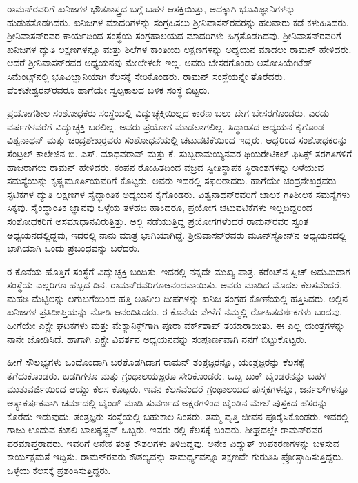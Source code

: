 ರಾಮನ್‍ರವರಿಗೆ ಖನಿಜಗಳ ಭೌತಶಾಸ್ತ್ರದ ಬಗ್ಗೆ ಬಹಳ ಆಸಕ್ತಿಯಿತ್ತು, ಅದಕ್ಕಾಗಿ ಭೂವಿಜ್ಞಾನಿಗಳನ್ನು ಹುಡುಕತೊಡಗಿದರು. ಖನಿಜಗಳ ಮಾದರಿಗಳನ್ನು ಸಂಗ್ರಹಿಸಲು ಶ‍್ರೀನಿವಾಸನ್‍ರವರನ್ನು ಹಲವಾರು ಕಡೆ ಕಳುಹಿಸಿದರು. ಶ‍್ರೀನಿವಾಸನ್‍ರವರ ಕಾರ್ಯದಿಂದ ಸಂಸ್ಥೆಯ ಸಂಗ್ರಹಾಲಯದ ಮಾದರಿಗಳು ಹಿಗ್ಗತೊಡಗಿದವು. ಶ‍್ರೀನಿವಾಸನ್‍ರವರಿಗೆ ಖನಿಜಗಳ ದ್ಯುತಿ ಲಕ್ಷಣಗಳನ್ನೂ ಮತ್ತು ಶಿಲೆಗಳ ಕಾಂತೀಯ ಲಕ್ಷಣಗಳನ್ನು ಅಧ್ಯಯನ ಮಾಡಲು ರಾಮನ್ ಹೇಳಿದರು. ಆದರೆ ಶ‍್ರೀನಿವಾಸನ್‍ರವರ ಅಧ್ಯಯನವು ಮೇಲೇಳಲೇ ಇಲ್ಲ. ಅವರು ಬೇಸರಗೊಂಡು ಅಸೋಸಿಯೇಟೆಡ್ ಸಿಮೆಂಟ್ಸ್‌ನಲ್ಲಿ ಭೂವಿಜ್ಞಾನಿಯಾಗಿ ಕೆಲಸಕ್ಕೆ ಸೇರಿಕೊಂಡರು. ರಾಮನ್ ಸಂಸ್ಥೆಯನ್ನೇ ತೊರೆದರು. ವೆಂಕಟೇಶ್ವರನ್‍ರವರೂ ಹಾಗೆಯೇ ಸ್ವಲ್ಪಕಾಲದ ಬಳಿಕ ಸಂಸ್ಥೆ ಬಿಟ್ಟರು.

ಪ್ರಯೋಗಶೀಲ ಸಂಶೋಧಕರು ಸಂಸ್ಥೆಯಲ್ಲಿ ವಿದ್ಯುಚ್ಛಕ್ತಿಯಿಲ್ಲದ ಕಾರಣ ಬಲು ಬೇಗ ಬೇಸರಗೊಂಡರು. ಎರಡು ವರ್ಷಗಳವರೆಗೆ ವಿದ್ಯುಚ್ಛಕ್ತಿ ಬರಲಿಲ್ಲ. ಅವರು ಪ್ರಯೋಗ ಮಾಡಲಾಗಲಿಲ್ಲ. ಸಿದ್ಧಾಂತದ ಅಧ್ಯಯನ ಕೈಗೊಂಡ ವಿಶ್ವನಾಥನ್ ಮತ್ತು ಚಂದ್ರಶೇಖರ್‍ರವರು ಸಂಶೋಧನೆಯಲ್ಲಿ ಚಟುವಟಿಕೆಯಿಂದ ಇದ್ದರು. ಆದ್ದರಿಂದ ಸಂಶೋಧಕರನ್ನು ಸೆಂಟ್ರಲ್ ಕಾಲೇಜಿನ ಬಿ. ಎಸ್. ಮಾಧವರಾವ್ ಮತ್ತು ಕೆ. ಸುಬ್ಬರಾಮಯ್ಯನವರ ಥಿಯರೇಟಿಕಲ್ ಫಿಸಿಕ್ಸ್ ತರಗತಿಗಳಿಗೆ ಹಾಜರಾಗಲು ರಾಮನ್ ಹೇಳಿದರು. ಕಂಪನ ರೋಹಿತದಿಂದ ವಜ್ರದ ಸ್ವೀತಿಸ್ಥಾಪಕ ಸ್ಥಿರಾಂಶಗಳನ್ನು ಅಳೆಯುವ ಸಮಸ್ಯೆಯನ್ನು ಕೃಷ್ಣಮೂರ್ತಿಯವರಿಗೆ ಕೊಟ್ಟರು. ಅವರು ಇದರಲ್ಲಿ ಸಫಲರಾದರು. ಹಾಗೆಯೇ ಚಂದ್ರಶೇಖರ್‍ರವರು ಸ್ಫಟಿಕಗಳ ದ್ಯುತಿ ಲಕ್ಷಣಗಳ ಸೈದ್ಧಾಂತಿಕ ಅಧ್ಯಯನ ಕೈಗೊಂಡರು. ವಿಶ್ವನಾಥನ್‍ರವರಿಗೆ ಜಾಲಕ ಗತಿಶೀಲಕ ಸಮಸ್ಯೆಗಳು ಸಿಕ್ಕವು. ಸೈಂದ್ಧಾಂತಿಕ ಜ್ಞಾನವು ಒಳ್ಳೆಯ ತಳಹದಿ ಹಾಕಿದರೂ, ಪ್ರಯೋಗ ಚಟುವಟಿಕೆಗಳು ಇಲ್ಲದಿದ್ದರಿಂದ ಸಂಶೋಧಕರಿಗೆ ಅಸಮಾಧಾನವಿರುತ್ತಿತ್ತು. ಅಲ್ಲಿ ನಡೆಯುತ್ತಿದ್ದ ಪ್ರಯೋಗಗಳೆಂದರೆ ರಾಮನ್‍ರವರ ಸ್ವಂತ ಅಧ್ಯಯನದಲ್ಲಿದ್ದವು, ಇದರಲ್ಲಿ ನಾನು ಮಾತ್ರ ಭಾಗಿಯಾಗಿದ್ದೆ. ಶ‍್ರೀನಿವಾಸನ್‍ರವರು ಮೂನ್‍ಸ್ಟೋನ್‍ನ ಅಧ್ಯಯನದಲ್ಲಿ ಭಾಗಿಯಾಗಿ ಒಂದು ಪ್ರಬಂಧವನ್ನು ಬರೆದರು.

ರ ಕೊನೆಯ ಹೊತ್ತಿಗೆ ಸಂಸ್ಥೆಗೆ ವಿದ್ಯುಚ್ಛಕ್ತಿ ಬಂದಿತು. ಇದರಲ್ಲಿ ನನ್ನದೇ ಮುಖ್ಯ ಪಾತ್ರ. ಕರೆಂಟ್‍ನ ಸ್ವಿಚ್ ಅದುಮಿದಾಗ ಸಂಸ್ಥೆಯ ಎಲ್ಲರಿಗೂ ಹಬ್ಬದ ದಿನ. ರಾಮನ್‍ರವರಿಗೂ\break ಆನಂದವಾಯಿತು. ಅವರು ಮಾಡಿದ ಮೊದಲ ಕೆಲಸವೆಂದರೆ, ಮಹಡಿ ಮೆಟ್ಟಿಲನ್ನು ಲಗುಬಗೆಯಿಂದ ಹತ್ತಿ ಅತಿನೀಲ ದೀಪಗಳನ್ನು ಖನಿಜ ಸಂಗ್ರಹ ಕೋಣೆಯಲ್ಲಿ ಹತ್ತಿಸಿದರು. ಅಲ್ಲಿನ ಖನಿಜಗಳ ಪ್ರತಿದೀಪ್ತಿಯನ್ನು ನೋಡಿ ಆನಂದಿಸಿದರು. ರ ಕೊನೆಯ ವೇಳೆಗೆ ನಮ್ಮಲ್ಲಿ ರೋಹಿತದರ್ಶಕಗಳು ಬಂದವು. ಹೀಗೆಯೇ ಎಕ್ಸ್\enginline{-}ರೇ ಘಟಕಗಳು ಮತ್ತು ಮೆಕ್ಯಾನಿಕ್ಸ್‌ಗಾಗಿ ಪೂರಾ ವರ್ಕ್‌ಶಾಪ್ ತಯಾರಾಯಿತು. ಈ ಎಲ್ಲ ಯಂತ್ರಗಳನ್ನು ನಾನೇ ಜೋಡಿಸಿದೆ. ಹಾಗಾಗಿ ಎಕ್ಸ್\enginline{-}ರೇ ವಿವರ್ತನ ಅಧ್ಯಯನವನ್ನು ಸಂಪೂರ್ಣವಾಗಿ ನನಗೆ ಬಿಟ್ಟುಕೊಟ್ಟರು.

ಹೀಗೆ ಸೌಲಭ್ಯಗಳು ಒಂದೊಂದಾಗಿ ಬರತೊಡಗಿದಾಗ ರಾಮನ್ ತಂತ್ರಜ್ಞರನ್ನೂ, ಯಂತ್ರಜ್ಞರನ್ನು ಕೆಲಸಕ್ಕೆ ತೆಗೆದುಕೊಂಡರು. ಬಡಗಿಗಳೂ ಮತ್ತು ಗ್ರಂಥಾಲಯಜ್ಞರೂ ಸೇರಿಕೊಂಡರು. ಒಬ್ಬ ಬುಕ್ ಬೈಂಡರನನ್ನು ಬಹಳ ಮುತುವರ್ಜಿಯಿಂದ ಆಯ್ದು ಕೆಲಸ ಕೊಟ್ಟರು. ಇವನ ಕೆಲಸವೆಂದರೆ ಗ್ರಂಥಾಲಯದ ಪುಸ್ತಕಗಳನ್ನೂ, ಜರ್ನಲ್‍ಗಳನ್ನೂ ಅತ್ಯಾಕರ್ಷಕವಾಗಿ ಚರ್ಮದಲ್ಲಿ ಬೈಂಡ್ ಮಾಡಿ ಸುವರ್ಣದ ಅಕ್ಷರಗಳಿಂದ ಬೈಂಡಿನ ಮೇಲೆ ಪುಸ್ತಕದ ಹೆಸರನ್ನು ಕೊರೆದು ಇಡುವುದು. ತಂತ್ರಜ್ಞರು ಸಂಸ್ಥೆಯಲ್ಲಿ ಬಹುಕಾಲ ನಿಂತರು. ತಮ್ಮ ವೃತ್ತಿ ಜೀವನ ಪೂರೈಸಿಕೊಂಡರು. ಇವರಲ್ಲಿ ಗಾಜು ಊದುವ ಕುಶಲಿ ಬಾಲಕೃಷ್ಣನ್ ಒಬ್ಬರು. ಇವರು ರಲ್ಲಿ ಕೆಲಸಕ್ಕೆ ಬಂದರು. ಶೀಘ್ರದಲ್ಲೇ ರಾಮನ್‍ರವರ ಪರಮಾಪ್ತರಾದರು. ಇವರಿಗೆ ಅನೇಕ ತಂತ್ರ ಕೌಶಲಗಳು ತಿಳಿದಿದ್ದವು. ಅನೇಕ ವಿದ್ಯುತ್ ಉಪಕರಣಗಳನ್ನು ಬಳಸುವ ಕಾರ್ಯಕ್ಷಮತೆ ಇದ್ದಿತು. ರಾಮನ್‍ರವರು ಕೌಶಲ್ಯವನ್ನು ಸಾಮರ್ಥ್ಯವನ್ನೂ ತಕ್ಷಣವೇ ಗುರುತಿಸಿ ಪ್ರೋತ್ಸಾಹಿಸುತ್ತಿದ್ದರು. ಒಳ್ಳೆಯ ಕೆಲಸಕ್ಕೆ ಪ್ರಶಂಸಿಸುತ್ತಿದ್ದರು.

